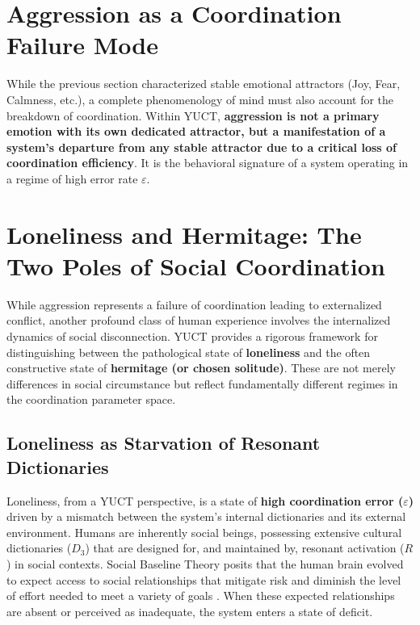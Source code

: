 \documentclass[12pt,a4paper]{article}
\begin{document}
	\section{Aggression as a Coordination Failure Mode}
	
	While the previous section characterized stable emotional attractors (Joy, Fear, Calmness, etc.), a complete phenomenology of mind must also account for the breakdown of coordination. Within YUCT, \textbf{aggression is not a primary emotion with its own dedicated attractor, but a manifestation of a system's departure from any stable attractor due to a critical loss of coordination efficiency}. It is the behavioral signature of a system operating in a regime of high error rate \(\varepsilon\).
	
	\section{Loneliness and Hermitage: The Two Poles of Social Coordination}
	
	While aggression represents a failure of coordination leading to externalized conflict, another profound class of human experience involves the internalized dynamics of social disconnection. YUCT provides a rigorous framework for distinguishing between the pathological state of \textbf{loneliness} and the often constructive state of \textbf{hermitage (or chosen solitude)}. These are not merely differences in social circumstance but reflect fundamentally different regimes in the coordination parameter space.
	
	\subsection{Loneliness as Starvation of Resonant Dictionaries}
	
	Loneliness, from a YUCT perspective, is a state of \textbf{high coordination error (\(\varepsilon\))} driven by a mismatch between the system's internal dictionaries and its external environment. Humans are inherently social beings, possessing extensive cultural dictionaries (\(D_3\)) that are designed for, and maintained by, resonant activation (\(R\)) in social contexts. Social Baseline Theory posits that the human brain evolved to expect access to social relationships that mitigate risk and diminish the level of effort needed to meet a variety of goals \cite{Beckes2015}. When these expected relationships are absent or perceived as inadequate, the system enters a state of deficit.
	
\end{document}
